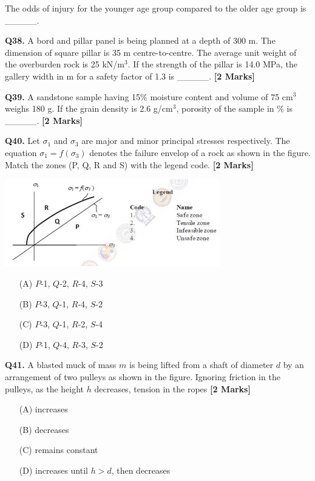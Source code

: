 \documentclass[11pt]{article}
\newcommand{\questionb}[2]{
    \noindent\textbf{Q#2.} #1 \hfill \textbf{[2 Marks]}
}
\begin{document}
The odds of injury for the younger age group compared to the older age group is \_\_\_\_\_.
\vspace{0.5cm}

\questionb{A bord and pillar panel is being planned at a depth of 300 m. The dimension of square pillar is 35 m centre-to-centre. The average unit weight of the overburden rock is 25 kN/m\(^3\). If the strength of the pillar is 14.0 MPa, the gallery width in m for a safety factor of 1.3 is \_\_\_\_\_.}{38}
\vspace{0.5cm}

\questionb{A sandstone sample having 15\% moisture content and volume of 75 cm\(^3\) weighs 180 g. If the grain density is 2.6 g/cm\(^3\), porosity of the sample in \% is \_\_\_\_\_.}{39}
\vspace{0.5cm}

\questionb{Let \(\sigma_1\) and \(\sigma_3\) are major and minor principal stresses respectively. The equation \(\sigma_1 = f(\sigma_3)\) denotes the failure envelop of a rock as shown in the figure. Match the zones (P, Q, R and S) with the legend code.}{40}

\begin{center}
\includegraphics[width=0.7\textwidth]{figures/40.png}
\end{center}

\begin{enumerate}
    \item[(A)] \(P\)-1, \(Q\)-2, \(R\)-4, \(S\)-3
    \item[(B)] \(P\)-3, \(Q\)-1, \(R\)-4, \(S\)-2
    \item[(C)] \(P\)-3, \(Q\)-1, \(R\)-2, \(S\)-4
    \item[(D)] \(P\)-1, \(Q\)-4, \(R\)-3, \(S\)-2
\end{enumerate}

\vspace{0.5cm}

\questionb{A blasted muck of mass \( m \) is being lifted from a shaft of diameter \( d \) by an arrangement of two pulleys as shown in the figure. Ignoring friction in the pulleys, as the height \( h \) decreases, tension in the ropes}{41}
\begin{enumerate}
    \item[(A)] increases  
    \item[(B)] decreases  
    \item[(C)] remains constant  
    \item[(D)] increases until \( h > d \), then decreases  
\end{enumerate}
\vspace{0.5cm}
\end{document}
